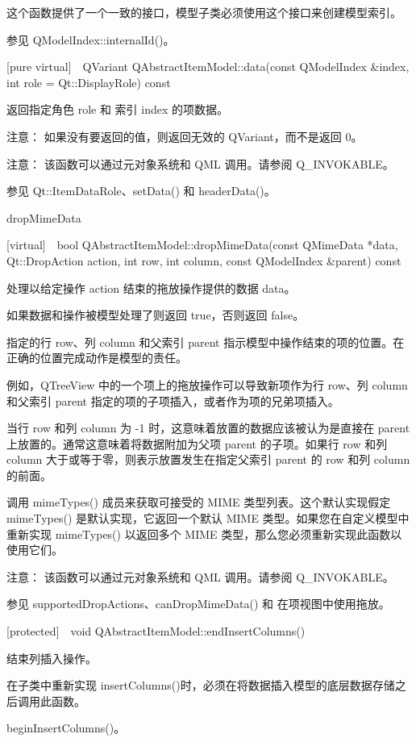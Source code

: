 这个函数提供了一个一致的接口，模型子类必须使用这个接口来创建模型索引。

参见 QModelIndex::internalId()。

[pure virtual] QVariant QAbstractItemModel::data(const QModelIndex \&index, int role = Qt::DisplayRole) const

返回指定角色 role 和 索引 index 的项数据。

注意： 如果没有要返回的值，则返回无效的 QVariant，而不是返回 0。

注意： 该函数可以通过元对象系统和 QML 调用。请参阅 Q\_INVOKABLE。

参见 Qt::ItemDataRole、setData() 和 headerData()。

dropMimeData

[virtual] bool QAbstractItemModel::dropMimeData(const QMimeData *data, Qt::DropAction action, int row, int column, const QModelIndex \&parent) const

处理以给定操作 action 结束的拖放操作提供的数据 data。

如果数据和操作被模型处理了则返回 true，否则返回 false。

指定的行 row、列 column 和父索引 parent 指示模型中操作结束的项的位置。在正确的位置完成动作是模型的责任。

例如，QTreeView 中的一个项上的拖放操作可以导致新项作为行 row、列 column 和父索引 parent 指定的项的子项插入，或者作为项的兄弟项插入。

当行 row 和列 column 为 -1 时，这意味着放置的数据应该被认为是直接在 parent 上放置的。通常这意味着将数据附加为父项 parent 的子项。如果行 row 和列 column 大于或等于零，则表示放置发生在指定父索引 parent 的 row 和列 column 的前面。

调用 mimeTypes() 成员来获取可接受的 MIME 类型列表。这个默认实现假定 mimeTypes() 是默认实现，它返回一个默认 MIME 类型。如果您在自定义模型中重新实现 mimeTypes() 以返回多个 MIME 类型，那么您必须重新实现此函数以使用它们。

注意： 该函数可以通过元对象系统和 QML 调用。请参阅 Q\_INVOKABLE。

参见 supportedDropActions、canDropMimeData() 和 在项视图中使用拖放。

[protected] void QAbstractItemModel::endInsertColumns()

结束列插入操作。

在子类中重新实现 insertColumns()时，必须在将数据插入模型的底层数据存储之后调用此函数。

\begin{seeAlso}
beginInsertColumns()。
\end{seeAlso}


